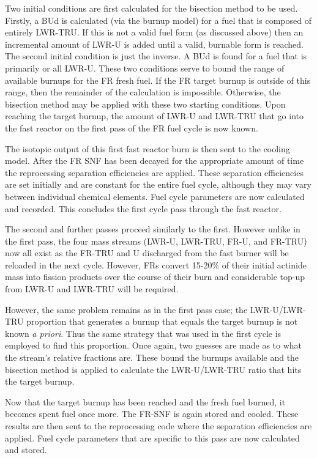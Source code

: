 Two initial conditions are first calculated for the bisection method to be used.  
Firstly, a BUd is calculated (via the burnup model) for a fuel that is composed of entirely LWR-TRU.  
If this is not a valid fuel form (as discussed above) then an incremental amount of LWR-U is added 
until a valid, burnable form is reached.  The second initial condition is just the inverse.  A BUd 
is found for a fuel that is primarily or all LWR-U.  These two conditions serve to bound the range 
of available burnups for the FR fresh fuel.  If the FR target burnup is outside of this range, then 
the remainder of the calculation is impossible.  Otherwise, the bisection method may be applied with 
these two starting conditions.  Upon reaching the target burnup, the amount of LWR-U and LWR-TRU that 
go into the fast reactor on the first pass of the FR fuel cycle is now known.

The isotopic output of this first fast reactor burn is then sent to the cooling model.   After the FR 
SNF has been decayed for the appropriate amount of time the reprocessing separation efficiencies are 
applied.  These separation efficiencies are set initially and are constant for the entire fuel cycle, 
although they may vary between individual chemical elements.  Fuel cycle parameters are now calculated 
and recorded.  This concludes the first cycle pass through the fast reactor.  

The second and further passes proceed similarly to the first.  However unlike in the first pass, the 
four mass streams (LWR-U, LWR-TRU, FR-U, and FR-TRU) now all exist as the FR-TRU and U discharged from 
the fast burner will be reloaded in the next cycle.  However, FRs convert 15-20\% of their initial 
actinide mass into fission products over the course of their burn and considerable top-up from LWR-U 
and LWR-TRU will be required.  

However, the same problem remains as in the first pass case; the LWR-U/LWR-TRU proportion 
that generates a burnup that equals the target burnup is not known \emph{a priori}.  Thus the same strategy 
that was used in the first cycle is employed to find this proportion.  Once again, two guesses are 
made as to what the stream's relative fractions are.  These bound the burnups available and the 
bisection method is applied to calculate the LWR-U/LWR-TRU ratio that hits the target burnup.  

Now that the target burnup has been reached and the fresh fuel burned, it becomes spent fuel once 
more.  The FR-SNF is again stored and cooled.  These results are then sent to the reprocessing code 
where the separation efficiencies are applied.  Fuel cycle parameters that are specific to this 
pass are now calculated and stored.

